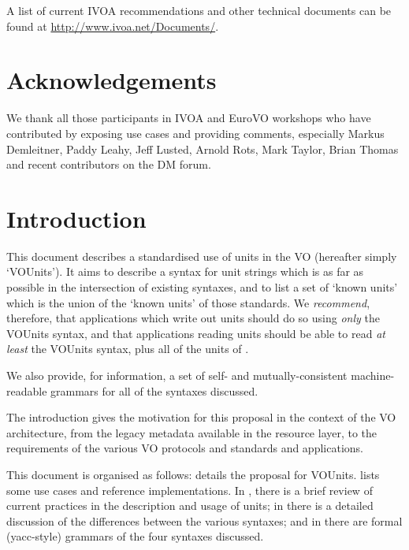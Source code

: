 \documentclass[11pt,notitlepage,onecolumn]{ivoa}
\begin{document}
A list of current IVOA recommendations and other technical documents can be found at
\url{http://www.ivoa.net/Documents/}.

\section*{Acknowledgements}

We thank all those participants in IVOA and EuroVO workshops who have
contributed by exposing use cases and providing comments, especially
Markus Demleitner,
Paddy Leahy,
Jeff Lusted,
Arnold Rots,
Mark Taylor,
Brian Thomas
and recent contributors on the DM forum.


\section{Introduction}

This document describes a standardised use of units in the VO
(hereafter simply `VOUnits').  It aims to describe a syntax for unit
strings which is as far as possible in the intersection of existing
syntaxes, and to list a set of `known units' which is
the union of the `known units' of those standards.
We \emph{recommend}, therefore, that applications which write out
units should do so using \emph{only} the VOUnits syntax, and that
applications reading units should be able to read \emph{at least} the
VOUnits syntax, plus all of the units of .

We also provide, for information, a set of self- and mutually-consistent
machine-readable grammars for all of the syntaxes discussed.

The introduction gives the motivation for
this proposal in the context of the VO architecture, from the legacy 
metadata available in the resource layer, to the requirements of the various 
VO protocols and standards and applications.

This document is organised as follows: 
details the proposal for VOUnits.  lists some
use cases and reference implementations.  In ,
there is a brief review of current practices in the description and
usage of units; in  there is a detailed
discussion of the differences between the various syntaxes; and
in  there are formal (yacc-style) grammars of
the four syntaxes discussed.
\end{document}
